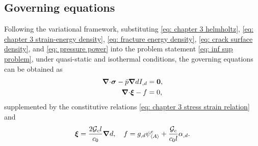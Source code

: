 \subsection{Governing equations}

Following the variational framework, substituting \eqref{eq: chapter 3 helmholtz}, \eqref{eq: chapter 3 strain-energy density}, \eqref{eq: fracture energy density}, \eqref{eq: crack surface density}, and \eqref{eq: pressure power} into the problem statement \eqref{eq: inf sup problem}, under quasi-static and isothermal conditions, the governing equations can be obtained as
\begin{align}
  {\boldsymbol{\nabla}\cdot} \boldsymbol{\sigma} - \bar{p} \boldsymbol{\nabla} d I_{,d} & = \boldsymbol{0}, \\
  {\boldsymbol{\nabla} \cdot} \boldsymbol{\xi} - f                     & = 0,      
\end{align}
supplemented by the constitutive relations \eqref{eq: chapter 3 stress strain relation} and
\begin{align}
  \boldsymbol{\xi} = \dfrac{2{\mathcal{G}_c} l}{c_0} \boldsymbol{\nabla} d, \quad f = g_{,d}\psi^e_{\left< A \right>} + \dfrac{{\mathcal{G}_c}}{c_0l}\alpha_{,d}.
\end{align}
